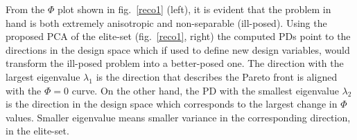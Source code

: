 

 
From the  $\Phi$ plot shown in fig.\ \ref{reco1} (left), it is evident that the problem in hand is both extremely anisotropic and non-separable (ill-posed). Using the proposed PCA of the elite-set (fig.\ \ref{reco1}, right) the computed PDs point to the directions in the design space which if used to define new design variables, would transform the ill-posed problem into a better-posed one. The direction with the largest eigenvalue $\lambda_1$ is the direction that describes the Pareto front is aligned with the $\Phi=0$ curve. On the other hand, the PD with the smallest eigenvalue $\lambda_2$ is the direction in the design space which corresponds to the largest change in $\Phi$ values. Smaller eigenvalue means smaller variance in the corresponding direction, in the elite-set. %

